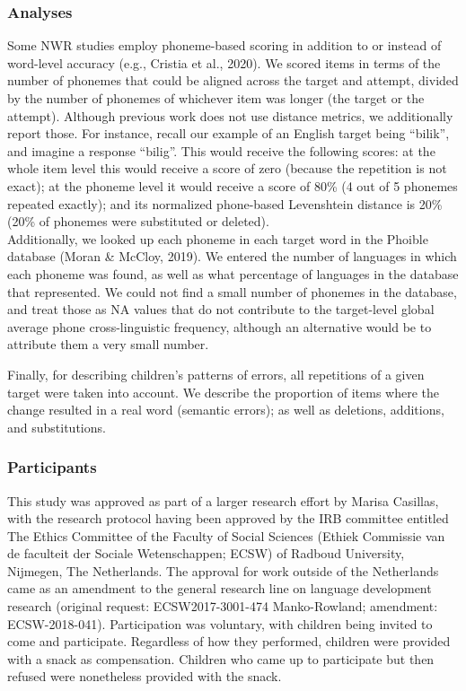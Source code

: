 \documentclass[english,,man,floatsintext]{apa6}
\begin{document}
\hypertarget{analyses}{%
\subsubsection{Analyses}\label{analyses}}

Some NWR studies employ phoneme-based scoring in addition to or instead of word-level accuracy (e.g., Cristia et al., 2020). We scored items in terms of the number of phonemes that could be aligned across the target and attempt, divided by the number of phonemes of whichever item was longer (the target or the attempt). Although previous work does not use distance metrics, we additionally report those. For instance, recall our example of an English target being ``bilik'', and imagine a response ``bilig''. This would receive the following scores: at the whole item level this would receive a score of zero (because the repetition is not exact); at the phoneme level it would receive a score of 80\% (4 out of 5 phonemes repeated exactly); and its normalized phone-based Levenshtein distance is 20\% (20\% of phonemes were substituted or deleted).\\

Additionally, we looked up each phoneme in each target word in the Phoible database (Moran \& McCloy, 2019). We entered the number of languages in which each phoneme was found, as well as what percentage of languages in the database that represented. We could not find a small number of phonemes in the database, and treat those as NA values that do not contribute to the target-level global average phone cross-linguistic frequency, although an alternative would be to attribute them a very small number.

Finally, for describing children's patterns of errors, all repetitions of a given target were taken into account. We describe the proportion of items where the change resulted in a real word (semantic errors); as well as deletions, additions, and substitutions.

\hypertarget{participants}{%
\subsubsection{Participants}\label{participants}}

This study was approved as part of a larger research effort by Marisa Casillas, with the research protocol having been approved by the IRB committee entitled The Ethics Committee of the Faculty of Social Sciences (Ethiek Commissie van de faculteit der Sociale Wetenschappen; ECSW) of Radboud University, Nijmegen, The Netherlands. The approval for work outside of the Netherlands came as an amendment to the general research line on language development research (original request: ECSW2017-3001-474 Manko-Rowland; amendment: ECSW-2018-041). Participation was voluntary, with children being invited to come and participate. Regardless of how they performed, children were provided with a snack as compensation. Children who came up to participate but then refused were nonetheless provided with the snack.
\end{document}
